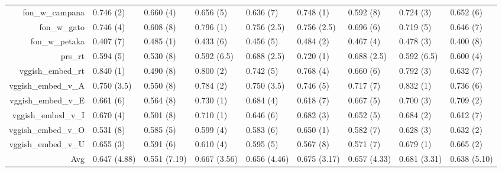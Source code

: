 \documentclass[a4paper,10pt]{article}
\begin{document}
\begin{table}[!htp]
{\begin{tabular}{rllllllll}
fon\_w\_campana&0.746 (2)&0.660 (4)&0.656 (5)&0.636 (7)&0.748 (1)&0.592 (8)&0.724 (3)&0.652 (6)\\
fon\_w\_gato&0.746 (4)&0.608 (8)&0.796 (1)&0.756 (2.5)&0.756 (2.5)&0.696 (6)&0.719 (5)&0.646 (7)\\
fon\_w\_petaka&0.407 (7)&0.485 (1)&0.433 (6)&0.456 (5)&0.484 (2)&0.467 (4)&0.478 (3)&0.400 (8)\\
prs\_rt&0.594 (5)&0.530 (8)&0.592 (6.5)&0.688 (2.5)&0.720 (1)&0.688 (2.5)&0.592 (6.5)&0.600 (4)\\
vggish\_embed\_rt&0.840 (1)&0.490 (8)&0.800 (2)&0.742 (5)&0.768 (4)&0.660 (6)&0.792 (3)&0.632 (7)\\
vggish\_embed\_v\_A&0.750 (3.5)&0.550 (8)&0.784 (2)&0.750 (3.5)&0.746 (5)&0.717 (7)&0.832 (1)&0.736 (6)\\
vggish\_embed\_v\_E&0.661 (6)&0.564 (8)&0.730 (1)&0.684 (4)&0.618 (7)&0.667 (5)&0.700 (3)&0.709 (2)\\
vggish\_embed\_v\_I&0.670 (4)&0.501 (8)&0.710 (1)&0.646 (6)&0.682 (3)&0.652 (5)&0.684 (2)&0.612 (7)\\
vggish\_embed\_v\_O&0.531 (8)&0.585 (5)&0.599 (4)&0.583 (6)&0.650 (1)&0.582 (7)&0.628 (3)&0.632 (2)\\
vggish\_embed\_v\_U&0.655 (3)&0.591 (6)&0.610 (4)&0.595 (5)&0.567 (8)&0.571 (7)&0.679 (1)&0.665 (2)\\
\Xhline{2\arrayrulewidth}
Avg&0.647 (4.88)&0.551 (7.19)&0.667 (3.56)&0.656 (4.46)&0.675 (3.17)&0.657 (4.33)&0.681 (3.31)&0.638 (5.10)\\
\end{tabular}}
\end{table}
\end{document}
